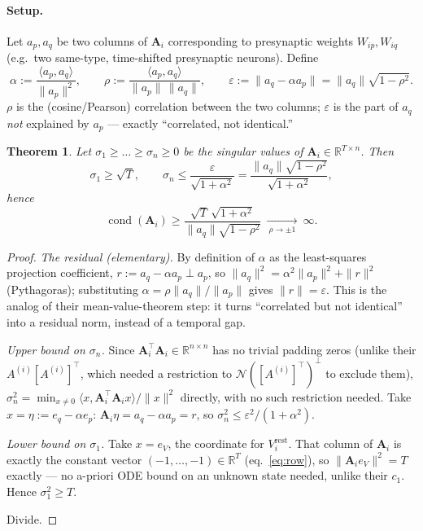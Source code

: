 \documentclass[11pt]{article}
\newcommand{\Mat}[1]{\mathbf{#1}}
\newcommand{\A}{\Mat{A}}
\DeclareMathOperator{\cond}{cond}
\newcommand{\eps}{\varepsilon}
\newtheorem{theorem}{Theorem}
\begin{document}
\paragraph{Setup.} Let $a_p, a_q$ be two columns of $\A_i$ corresponding to
presynaptic weights $W_{ip}, W_{iq}$ (e.g.\ two same-type, time-shifted
presynaptic neurons). Define
\begin{equation}
\alpha := \frac{\langle a_p,a_q\rangle}{\|a_p\|^2}, \qquad
\rho := \frac{\langle a_p,a_q\rangle}{\|a_p\|\,\|a_q\|}, \qquad
\eps := \|a_q-\alpha a_p\| = \|a_q\|\sqrt{1-\rho^2} .
\label{eq:corr-def}
\end{equation}
$\rho$ is the (cosine/Pearson) correlation between the two columns; $\eps$
is the part of $a_q$ \emph{not} explained by $a_p$ --- exactly ``correlated,
not identical.''

\begin{theorem}
Let $\sigma_1\ge\dots\ge\sigma_n\ge0$ be the singular values of
$\A_i\in\mathbb R^{T\times n}$. Then
\begin{equation}
\sigma_1 \ge \sqrt T, \qquad
\sigma_n \le \frac{\eps}{\sqrt{1+\alpha^2}} = \frac{\|a_q\|\sqrt{1-\rho^2}}{\sqrt{1+\alpha^2}} ,
\label{eq:corr-thm}
\end{equation}
hence
\begin{equation}
\cond(\A_i) \ge \frac{\sqrt T\,\sqrt{1+\alpha^2}}{\|a_q\|\sqrt{1-\rho^2}}
\ \xrightarrow[\ \rho\to\pm1\ ]{}\ \infty .
\label{eq:corr-cond}
\end{equation}
\end{theorem}

\begin{proof}
\emph{The residual (elementary).} By definition of $\alpha$ as the
least-squares projection coefficient, $r:=a_q-\alpha a_p \perp a_p$, so
$\|a_q\|^2=\alpha^2\|a_p\|^2+\|r\|^2$ (Pythagoras); substituting
$\alpha=\rho\|a_q\|/\|a_p\|$ gives $\|r\|=\eps$. This is the analog of
their mean-value-theorem step: it turns ``correlated but not identical''
into a residual norm, instead of a temporal gap.

\emph{Upper bound on $\sigma_n$.} Since $\A_i^{\!\top}\A_i\in\mathbb
R^{n\times n}$ has no trivial padding zeros (unlike their $A^{(i)}[A^{(i)}]^\top$,
which needed a restriction to $\mathcal N([A^{(i)}]^\top)^\perp$ to exclude
them), $\sigma_n^2=\min_{x\ne0}\langle x,\A_i^{\!\top}\A_ix\rangle/\|x\|^2$
directly, with no such restriction needed. Take
$x=\eta:=e_q-\alpha e_p$: $\A_i\eta=a_q-\alpha a_p=r$, so
$\sigma_n^2\le\eps^2/(1+\alpha^2)$.

\emph{Lower bound on $\sigma_1$.} Take $x=e_V$, the coordinate for
$V_i^{\mathrm{rest}}$. That column of $\A_i$ is exactly the constant vector
$(-1,\dots,-1)\in\mathbb R^T$ (eq.~\eqref{eq:row}), so $\|\A_ie_V\|^2=T$
exactly --- no a-priori ODE bound on an unknown state needed, unlike their
$c_1$. Hence $\sigma_1^2\ge T$.

Divide.
\end{proof}
\end{document}
